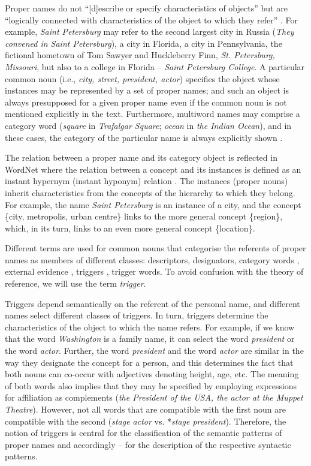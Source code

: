 \documentclass[output=paper]{langsci/langscibook}
\begin{document}
Proper names do not “[d]escribe or specify characteristics of objects” but
are “logically connected with characteristics of the object to which
they refer” \citep[173]{searle1958}. For example, \textit{Saint Petersburg}
may refer to the second largest city in Russia (\textit{They convened
in Saint Petersburg}), a city in Florida, a city in Pennsylvania, the
fictional hometown of Tom Sawyer and Huckleberry Finn, \textit{St.
Petersburg, Missouri}, but also to a college in Florida – \textit{Saint
Petersburg College}. A particular common noun (i.e., \textit{city,
street, president, actor}) specifies the object whose instances may be
represented by a set of proper names; and such an object is always
presupposed for a given proper name even if the common noun is not
mentioned explicitly in the text. Furthermore, multiword names  may
comprise a category word (\textit{square} in \textit{Trafalgar Square};
\textit{ocean} in \textit{the Indian Ocean}), and in these cases, the
category of the particular name is always explicitly shown \citep[144]{carroll1985}.




The relation between a proper name and its category object is reflected
in WordNet where the relation between a concept and its instances is
defined as an instant hypernym (instant hyponym) relation
\citep{rodriguez1998}. The
instances (proper nouns) inherit characteristics from the concepts of
the hierarchy to which they belong. For example, the name \textit{Saint
Petersburg} is an instance of a city, and the concept \{city,
metropolis, urban centre\} links to the more general concept
\{region\}, which, in its turn, links to an even more general concept
\{location\}.



Different terms are used for common nouns that categorise the referents
of proper names as members of different classes: descriptors,
designators, category words \citep{carroll1985}, external evidence \citep{mcdonald1996}, triggers \citep{magnini2002}, trigger words. To avoid
confusion with the theory of reference, we will use the term \textit{trigger}.


Triggers depend semantically on the referent of the personal name, and
different names select different classes of triggers. In turn, triggers
determine the characteristics of the object to which the name refers.
For example, if we know that the word \textit{Washington} is a family
name, it can select the word \textit{president} or the word
\textit{actor}. Further, the word \textit{president} and the word
\textit{actor} are similar in the way they designate the concept for a
person, and this determines the fact that both nouns can co-occur with
adjectives denoting height, age, etc. The meaning of both words also
implies that they may be specified by employing expressions for
affiliation as complements (\textit{the President of the USA, the actor
at the Muppet Theatre}). However, not all words that are compatible
with the first noun are compatible with the second (\textit{stage
actor} vs. *\textit{stage president}). Therefore, the notion of
triggers is central for the classification of the semantic patterns of
proper names and accordingly – for the description of the respective
syntactic patterns.
\end{document}
